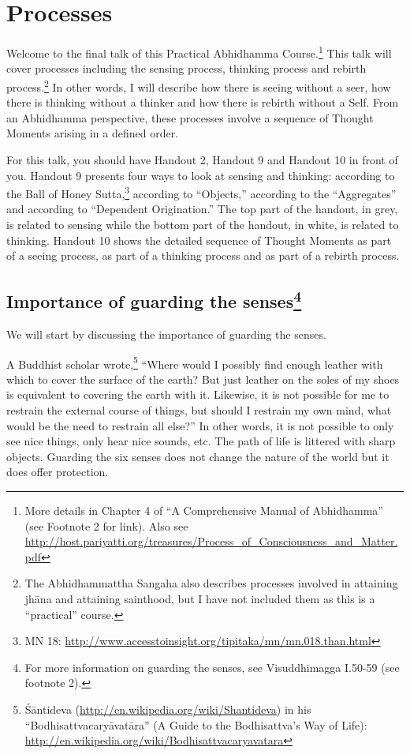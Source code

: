 \section{Processes}

Welcome to the final talk of this Practical Abhidhamma Course.\footnote{More details in Chapter 4 of “A Comprehensive Manual of Abhidhamma” (see Footnote 2 for link). \newline Also see \url{http://host.pariyatti.org/treasures/Process_of_Consciousness_and_Matter.pdf}} This talk will cover processes including the sensing process, thinking process and rebirth process.\footnote{The Abhidhammattha Sangaha also describes processes involved in attaining jhāna and attaining sainthood, but I have not included them as this is a “practical” course.} In other words, I will describe how there is seeing without a seer, how there is thinking without a thinker and how there is rebirth without a Self. From an Abhidhamma perspective, these processes involve a sequence of Thought Moments arising in a defined order.

For this talk, you should have Handout 2, Handout 9 and Handout 10 in front of you. Handout 9 presents four ways to look at sensing and thinking: according to the Ball of Honey Sutta,\footnote{MN 18: \url{http://www.accesstoinsight.org/tipitaka/mn/mn.018.than.html}} according to “Objects,” according to the “Aggregates” and according to “Dependent Origination.” The top part of the handout, in grey, is related to sensing while the bottom part of the handout, in white, is related to thinking. Handout 10 shows the detailed sequence of Thought Moments as part of a seeing process, as part of a thinking process and as part of a rebirth process.

\subsection*{Importance of guarding the senses\footnote{For more information on guarding the senses, see Visuddhimagga I.50-59 (see footnote 2).}}

We will start by discussing the importance of guarding the senses.

A Buddhist scholar wrote,\footnote{Śāntideva (\url{http://en.wikipedia.org/wiki/Shantideva}) in his “Bodhisattvacaryāvatāra” (A Guide to the Bodhisattva’s Way of Life): \url{http://en.wikipedia.org/wiki/Bodhisattvacaryavatara}} “Where would I possibly find enough leather with which to cover the surface of the earth? But just leather on the soles of my shoes is equivalent to covering the earth with it. Likewise, it is not possible for me to restrain the external course of things, but should I restrain my own mind, what would be the need to restrain all else?” In other words, it is not possible to only see nice things, only hear nice sounds, etc. The path of life is littered with sharp objects. Guarding the six senses does not change the nature of the world but it does offer protection.

